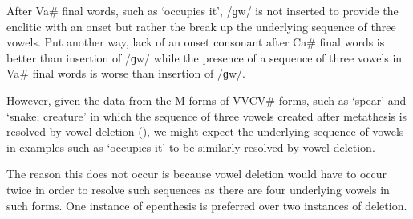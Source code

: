 After Va{\#} final words, such as 
 `occupies it',
/ɡw/ is not inserted to provide the enclitic with an onset
but rather the break up the underlying sequence of three vowels.
Put another way, lack of an onset consonant
after Ca{\#} final words is better than insertion
of /ɡw/ while the presence of a sequence of three
vowels in Va{\#} final words is worse than insertion of /ɡw/. 

However, given the data from the M-forms of VVCV{\#} forms,
such as  {\ra}  `spear'
and  {\ra}  `snake; creature'
in which the sequence of three vowels created after metathesis
is resolved by vowel deletion (),
we might expect the underlying sequence of vowels
in examples such as  {\ra}  `occupies it'
to be similarly resolved by vowel deletion.

The reason this does not occur
is because vowel deletion would have to occur
twice in order to resolve such sequences
as there are four underlying vowels in such forms.
One instance of epenthesis is preferred over two instances of deletion.


